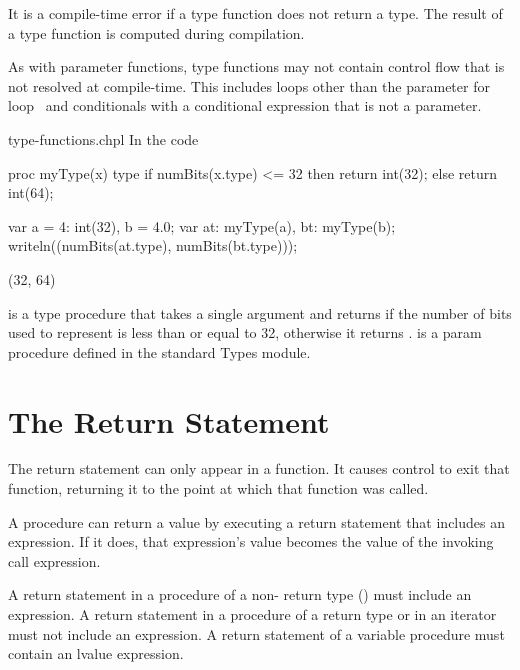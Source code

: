 It is a compile-time error if a type function does not return a type.
The result of a type function is computed during compilation.

As with parameter functions, type functions may not contain control
flow that is not resolved at compile-time.  This includes loops other
than the parameter for loop~ and
conditionals with a conditional expression that is not a parameter.

\begin{chapelexample}{type-functions.chpl}
In the code
\begin{chapel}
proc myType(x) type {
  if numBits(x.type) <= 32 then return int(32);
  else return int(64);
}
\end{chapel}
\begin{chapelpost}
var a = 4: int(32),
    b = 4.0;
var at: myType(a),
    bt: myType(b);
writeln((numBits(at.type), numBits(bt.type)));
\end{chapelpost}
\begin{chapeloutput}
(32, 64)
\end{chapeloutput}
 is a type procedure that takes a single
argument  and returns  if the number of bits used to
represent  is less than or equal to 32, otherwise it
returns .   is a param
procedure defined in the standard Types module.
\end{chapelexample}


\section{The Return Statement}
\label{The_Return_Statement}

The return statement can only appear in a function.  It causes control
to exit that function, returning it to the point at which that function
was called.

A procedure can return a value by executing a return statement
that includes an expression. If it does, that expression's value
becomes the value of the invoking call expression.

A return statement in a procedure of a non- return type
() must include an expression.
A return statement in a procedure of a  return type
or in an iterator must not include an expression.
A return statement of a variable procedure must contain an lvalue expression.

